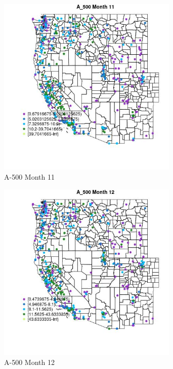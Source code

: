 \begin{figure} 
\centering  
\includegraphics[width=0.77\textwidth]{Code_Outputs/ML_input_report_ML_input_PM25_Step5_part_d_de_duplicated_aves_ML_input_MapObsMo11A_500.jpg} 
\caption{\label{fig:ML_input_report_ML_input_PM25_Step5_part_d_de_duplicated_aves_ML_inputMapObsMo11A_500}A-500 Month 11} 
\end{figure} 
 

\begin{figure} 
\centering  
\includegraphics[width=0.77\textwidth]{Code_Outputs/ML_input_report_ML_input_PM25_Step5_part_d_de_duplicated_aves_ML_input_MapObsMo12A_500.jpg} 
\caption{\label{fig:ML_input_report_ML_input_PM25_Step5_part_d_de_duplicated_aves_ML_inputMapObsMo12A_500}A-500 Month 12} 
\end{figure} 
 

